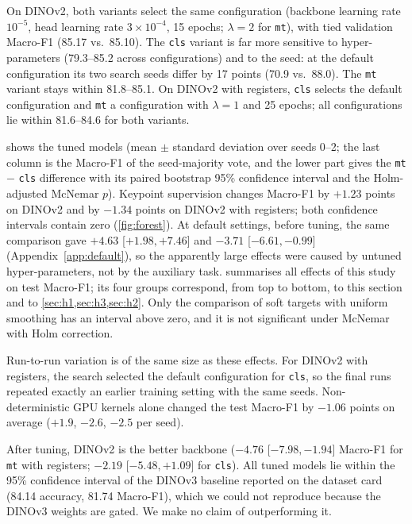 \documentclass[11pt]{article}
\newcommand{\cls}{\texttt{cls}}
\newcommand{\mt}{\texttt{mt}}
\begin{document}
On DINOv2, both variants select the same configuration (backbone learning rate $10^{-5}$, head learning rate
$3 \times 10^{-4}$, 15 epochs; $\lambda = 2$ for \mt{}), with tied validation Macro-F1 (85.17 vs.\ 85.10).
The \cls{} variant is far more sensitive to hyper-parameters (79.3--85.2 across configurations) and to the
seed: at the default configuration its two search seeds differ by 17 points (70.9 vs.\ 88.0). The \mt{}
variant stays within 81.8--85.1. On DINOv2 with registers, \cls{} selects the default configuration and \mt{}
a configuration with $\lambda = 1$ and 25 epochs; all configurations lie within 81.6--84.6 for both variants.

 shows the tuned models (mean $\pm$ standard deviation over seeds 0--2; the last column is
the Macro-F1 of the seed-majority vote, and the lower part gives the \mt{} $-$ \cls{} difference with its paired
bootstrap 95\% confidence interval and the Holm-adjusted McNemar $p$). Keypoint supervision changes Macro-F1 by $+1.23$ points on DINOv2 and
by $-1.34$ points on DINOv2 with registers; both confidence intervals contain zero (\cref{fig:forest}). At
default settings, before tuning, the same comparison gave $+4.63$ [$+1.98, +7.46$] and $-3.71$
[$-6.61, -0.99$] (Appendix~\ref{app:default}), so the apparently large effects were caused by untuned
hyper-parameters, not by the auxiliary task.  summarises all effects of this study on
test Macro-F1; its four groups correspond, from top to bottom, to this section and to
\cref{sec:h1,sec:h3,sec:h2}. Only the comparison of soft targets with uniform smoothing has an interval above
zero, and it is not significant under McNemar with Holm correction.

Run-to-run variation is of the same size as these effects. For DINOv2 with registers, the search selected the
default configuration for \cls{}, so the final runs repeated exactly an earlier training setting with the same
seeds. Non-deterministic GPU kernels alone changed the test Macro-F1 by $-1.06$ points on average
($+1.9$, $-2.6$, $-2.5$ per seed).

After tuning, DINOv2 is the better backbone ($-4.76$ [$-7.98, -1.94$] Macro-F1 for \mt{} with registers;
$-2.19$ [$-5.48, +1.09$] for \cls{}). All tuned models lie within the 95\% confidence interval of the DINOv3
baseline reported on the dataset card (84.14 accuracy, 81.74 Macro-F1), which we could not reproduce because
the DINOv3 weights are gated. We make no claim of outperforming it.
\end{document}
